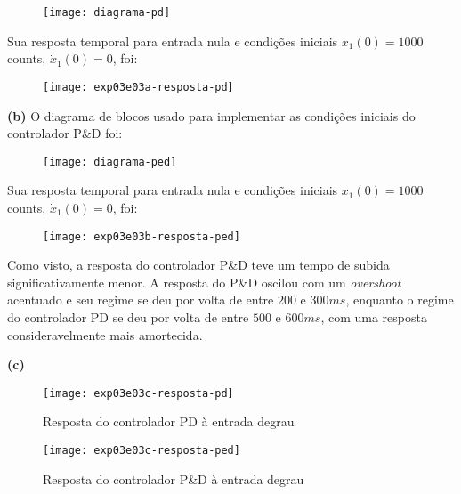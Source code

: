 \documentclass[a4paper,11pt]{article}
\begin{document}
\begin{figure}[H]
\centering
\texttt{[image: diagrama-pd]}
\end{figure}

Sua resposta temporal para entrada nula e condições iniciais
$x_1\left(0\right) = 1000$ counts, $\dot{x}_1\left(0\right) = 0$, foi:

\begin{figure}[H]
\centering
\texttt{[image: exp03e03a-resposta-pd]}
\end{figure}

\textbf{(b)}
O diagrama de blocos usado para implementar as condições iniciais do controlador
P\&D foi:

\begin{figure}[H]
\centering
\texttt{[image: diagrama-ped]}
\end{figure}

Sua resposta temporal para entrada nula e condições iniciais
$x_1\left(0\right) = 1000$ counts, $\dot{x}_1\left(0\right) = 0$, foi:

\begin{figure}[H]
\centering
\texttt{[image: exp03e03b-resposta-ped]}
\end{figure}

Como visto, a resposta do controlador P\&D teve um tempo de subida
significativamente menor. A resposta do P\&D oscilou com um \textit{overshoot}
acentuado e seu regime se deu por volta de entre $200$ e $300ms$, enquanto o
regime do controlador PD se deu por volta de entre $500$ e $600ms$, com uma
resposta consideravelmente mais amortecida.

\pagebreak

\textbf{(c)}

\begin{figure}[H]
\centering
\texttt{[image: exp03e03c-resposta-pd]}
\caption{Resposta do controlador PD à entrada degrau}
\end{figure}

\begin{figure}[H]
\centering
\texttt{[image: exp03e03c-resposta-ped]}
\caption{Resposta do controlador P\&D à entrada degrau}
\end{figure}
\end{document}
